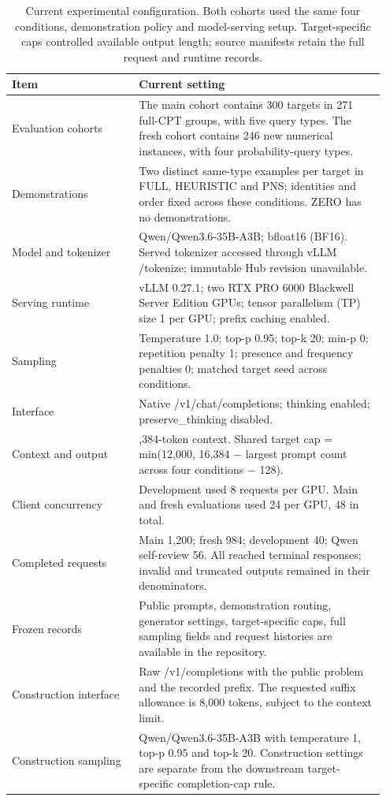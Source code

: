 \begin{table}[htbp]
\centering
\begingroup
\setlength{\tabcolsep}{2pt}
\begin{tabular}{@{}>{\raggedright\arraybackslash}p{0.32\linewidth}>{\raggedright\arraybackslash}p{0.62\linewidth}@{}}
\toprule
\textbf{Item} & \textbf{Current setting} \\
\midrule
Evaluation cohorts & The main cohort contains 300 targets in 271 full-CPT groups, with five query types. The fresh cohort contains 246 new numerical instances, with four probability-query types. \\
Demonstrations & Two distinct same-type examples per target in FULL, HEURISTIC and PNS; identities and order fixed across these conditions. ZERO has no demonstrations. \\
Model and tokenizer & Qwen/Qwen3.6-35B-A3B; bfloat16 (BF16). Served tokenizer accessed through vLLM /tokenize; immutable Hub revision unavailable. \\
Serving runtime & vLLM 0.27.1; two RTX PRO 6000 Blackwell Server Edition GPUs; tensor parallelism (TP) size 1 per GPU; prefix caching enabled. \\
Sampling & Temperature 1.0; top-p 0.95; top-k 20; min-p 0; repetition penalty 1; presence and frequency penalties 0; matched target seed across conditions. \\
Interface & Native /v1/chat/completions; thinking enabled; preserve\_thinking disabled. \\
Context and output & 16,384-token context. Shared target cap = min(12,000, 16,384 \ensuremath{-} largest prompt count across four conditions \ensuremath{-} 128). \\
Client concurrency & Development used 8 requests per GPU. Main and fresh evaluations used 24 per GPU, 48 in total. \\
Completed requests & Main 1,200; fresh 984; development 40; Qwen self-review 56. All reached terminal responses; invalid and truncated outputs remained in their denominators. \\
Frozen records & Public prompts, demonstration routing, generator settings, target-specific caps, full sampling fields and request histories are available in the repository. \\
Construction interface & Raw /v1/completions with the public problem and the recorded prefix. The requested suffix allowance is 8,000 tokens, subject to the context limit. \\
Construction sampling & Qwen/Qwen3.6-35B-A3B with temperature 1, top-p 0.95 and top-k 20. Construction settings are separate from the downstream target-specific completion-cap rule. \\
\bottomrule
\end{tabular}
\endgroup
\caption[Current experimental configuration]{Current experimental configuration. Both cohorts used the same four conditions, demonstration policy and model-serving setup. Target-specific caps controlled available output length; source manifests retain the full request and runtime records.}\label{tab:4.1}


\end{table}
